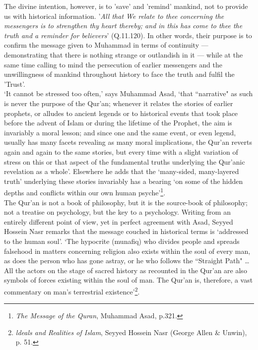 \documentclass[10pt, twoside,openright]{book}
\begin{document}
The divine intention, however, is to 'save' and 'remind' mankind, not to provide us with historical 
information. '\emph{All that We relate to thee concerning the messengers is to strengthen thy heart 
thereby; and in this has come to thee the truth and a reminder for believers}' (Q.11.120). In other 
words, their purpose is to confirm the message given to Muhammad in terms of continuity --- 
demonstrating that there is nothing strange or outlandish in it --- while at the same time calling to 
mind the persecution of earlier messengers and the unwillingness of mankind throughout history to 
face the truth and fulfil the 'Trust'. \\

`It cannot be stressed too often,' says Muhammad Asad, `that ``narrative" as such is never the purpose 
of the Qur'an; whenever it relates the stories of earlier prophets, or alludes to ancient legends or 
to historical events that took place before the advent of Islam or during the lifetime of the 
Prophet, the aim is invariably a moral lesson; and since one and the same event, or even legend, 
usually has many facets revealing as many moral implications, the Qur'an reverts again and again to 
the same stories, but every time with a slight variation of stress on this or that aspect of the 
fundamental truths underlying the Qur'anic revelation as a whole'. Elsewhere he adds that the 
`many\hyp{}sided, many\hyp{}layered truth' underlying these stories invariably has a bearing `on some of the hidden depths and conflicts within our own human psyche'\footnote{\emph{The Message of the Quran}, Muhammad Asad, p.321.}.\\

The Qur'an is not a book of philosophy, but it is the source\hyp{}book of philosophy; not a treatise on 
psychology, but the key to a psychology. Writing from an entirely different point of view, yet in 
perfect agreement with Asad, Seyyed Hossein Nasr remarks that the message couched in historical terms 
is `addressed to the human soul'. `The hypocrite (munafiq) who divides people and spreads falsehood 
in matters concerning religion also exists within the soul of every man, as does the person who has 
gone astray, or he who follows the ``Straight Path" \ldots{} All the actors on the stage of sacred history 
as recounted in the Qur'an are also symbols of forces existing within the soul of man. The Qur'an is, 
therefore, a vast commentary on man's terrestrial existence'\footnote{\emph{ldeals and Realities of Islam}, Seyyed Hossein Nasr (George Allen \& Unwin), p. 51.}.\\
\end{document}
